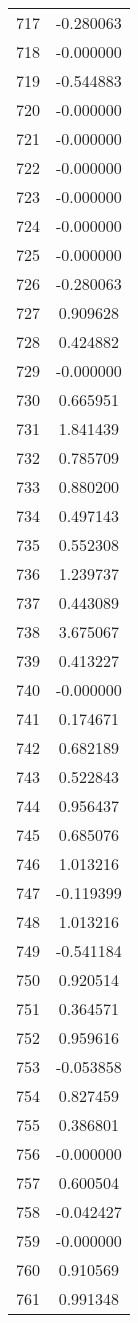 \documentclass[12pt]{article}
\begin{document}
\begin{longtable}{@{}cc@{}}
717 & -0.280063 \\
718 & -0.000000 \\
719 & -0.544883 \\
720 & -0.000000 \\
721 & -0.000000 \\
722 & -0.000000 \\
723 & -0.000000 \\
724 & -0.000000 \\
725 & -0.000000 \\
726 & -0.280063 \\
727 & 0.909628 \\
728 & 0.424882 \\
729 & -0.000000 \\
730 & 0.665951 \\
731 & 1.841439 \\
732 & 0.785709 \\
733 & 0.880200 \\
734 & 0.497143 \\
735 & 0.552308 \\
736 & 1.239737 \\
737 & 0.443089 \\
738 & 3.675067 \\
739 & 0.413227 \\
740 & -0.000000 \\
741 & 0.174671 \\
742 & 0.682189 \\
743 & 0.522843 \\
744 & 0.956437 \\
745 & 0.685076 \\
746 & 1.013216 \\
747 & -0.119399 \\
748 & 1.013216 \\
749 & -0.541184 \\
750 & 0.920514 \\
751 & 0.364571 \\
752 & 0.959616 \\
753 & -0.053858 \\
754 & 0.827459 \\
755 & 0.386801 \\
756 & -0.000000 \\
757 & 0.600504 \\
758 & -0.042427 \\
759 & -0.000000 \\
760 & 0.910569 \\
761 & 0.991348 \\

\end{longtable}
\end{document}
